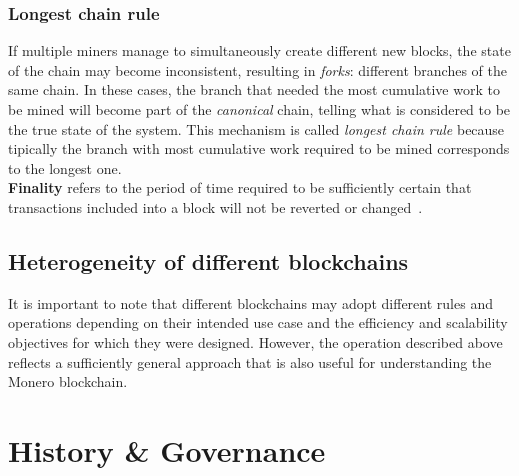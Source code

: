 \documentclass[conference]{IEEEtran}
\begin{document}
\subsubsection{Longest chain rule}
If multiple miners manage to simultaneously create different new blocks, the state of the chain may become inconsistent, resulting in \textit{forks}: different branches of the same chain. In these cases, the branch that needed the most cumulative work to be mined will become part of the \textit{canonical} chain, telling what is considered to be the true state of the system. This mechanism is called \textit{longest chain rule} because tipically the branch with most cumulative work required to be mined corresponds to the longest one.~\cite{longest_chain}\\
\textbf{Finality} refers to the period of time required to be sufficiently certain that transactions included into a block will not be reverted or changed~\cite{finality_meaning}.

\subsection{Heterogeneity of different blockchains}
It is important to note that different blockchains may adopt different rules and operations depending on their intended use case and the efficiency and scalability objectives for which they were designed. However, the operation described above reflects a sufficiently general approach that is also useful for understanding the Monero blockchain.



\section{History \& Governance}
\end{document}
